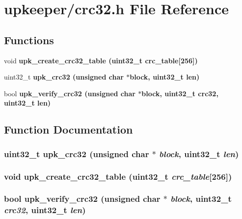 \section{upkeeper/crc32.h File Reference}
\label{crc32_8h}
\subsection*{Functions}
\begin{CompactItemize}
\item 
void \bf{upk\_\-create\_\-crc32\_\-table} (uint32\_\-t crc\_\-table[256])
\item 
uint32\_\-t \bf{upk\_\-crc32} (unsigned char $\ast$block, uint32\_\-t len)
\item 
bool \bf{upk\_\-verify\_\-crc32} (unsigned char $\ast$block, uint32\_\-t crc32, uint32\_\-t len)
\end{CompactItemize}


\subsection{Function Documentation}
\subsubsection{\setlength{\rightskip}{0pt plus 5cm}uint32\_\-t upk\_\-crc32 (unsigned char $\ast$ {\em block}, uint32\_\-t {\em len})}\label{crc32_8h_9f317e8418a0af4b71851819bf8ce01c}


\subsubsection{\setlength{\rightskip}{0pt plus 5cm}void upk\_\-create\_\-crc32\_\-table (uint32\_\-t {\em crc\_\-table}[256])}\label{crc32_8h_2b6933bfdf4caa303dbdb7626417e01a}


\subsubsection{\setlength{\rightskip}{0pt plus 5cm}bool upk\_\-verify\_\-crc32 (unsigned char $\ast$ {\em block}, uint32\_\-t {\em crc32}, uint32\_\-t {\em len})}\label{crc32_8h_135c3c60ebe008d88d6812b51a42e57f}


